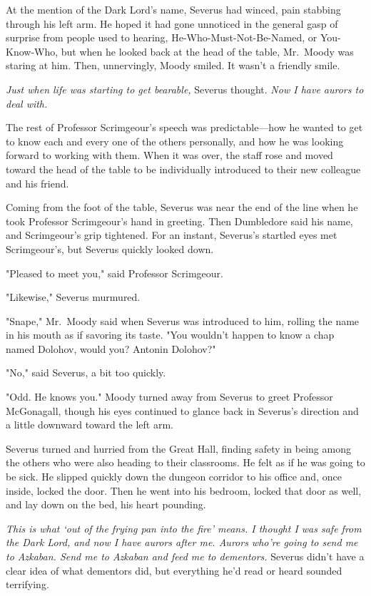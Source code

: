 At the mention of the Dark Lord's name, Severus had winced, pain stabbing through his left arm. He hoped it had gone unnoticed in the general gasp of surprise from people used to hearing, He-Who-Must-Not-Be-Named, or You-Know-Who, but when he looked back at the head of the table, Mr.~Moody was staring at him. Then, unnervingly, Moody smiled. It wasn't a friendly smile.

\emph{Just when life was starting to get bearable,} Severus thought. \emph{Now I have aurors to deal with.}

The rest of Professor Scrimgeour's speech was predictable—how he wanted to get to know each and every one of the others personally, and how he was looking forward to working with them. When it was over, the staff rose and moved toward the head of the table to be individually introduced to their new colleague and his friend.

Coming from the foot of the table, Severus was near the end of the line when he took Professor Scrimgeour's hand in greeting. Then Dumbledore said his name, and Scrimgeour's grip tightened. For an instant, Severus's startled eyes met Scrimgeour's, but Severus quickly looked down.

"Pleased to meet you," said Professor Scrimgeour.

"Likewise," Severus murmured.

"Snape," Mr.~Moody said when Severus was introduced to him, rolling the name in his mouth as if savoring its taste. "You wouldn't happen to know a chap named Dolohov, would you? Antonin Dolohov?"

"No," said Severus, a bit too quickly.

"Odd. He knows you." Moody turned away from Severus to greet Professor McGonagall, though his eyes continued to glance back in Severus's direction and a little downward toward the left arm.

Severus turned and hurried from the Great Hall, finding safety in being among the others who were also heading to their classrooms. He felt as if he was going to be sick. He slipped quickly down the dungeon corridor to his office and, once inside, locked the door. Then he went into his bedroom, locked that door as well, and lay down on the bed, his heart pounding.

\emph{This is what `out of the frying pan into the fire' means. I thought I was safe from the Dark Lord, and now I have aurors after me. Aurors who're going to send me to Azkaban. Send me to Azkaban and feed me to dementors.} Severus didn't have a clear idea of what dementors did, but everything he'd read or heard sounded terrifying.

